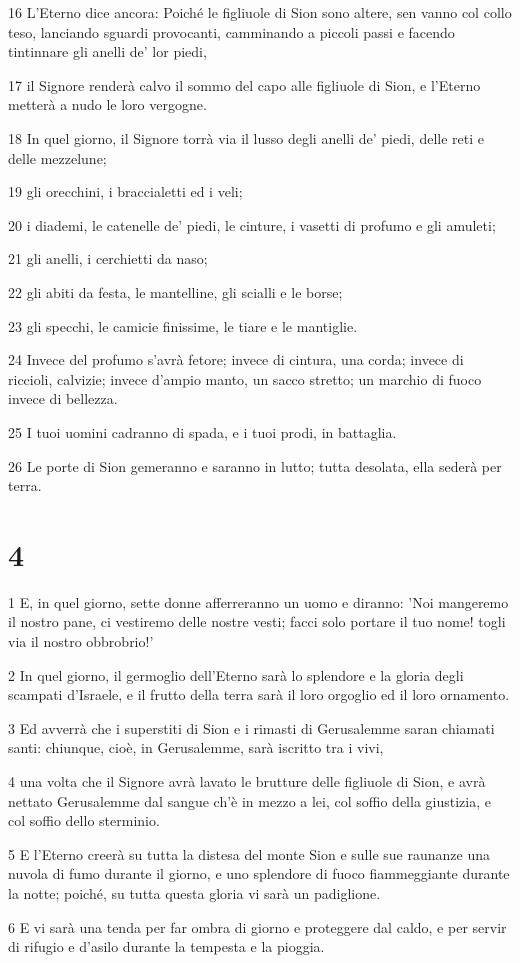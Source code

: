\par 16 L'Eterno dice ancora: Poiché le figliuole di Sion sono altere, sen vanno col collo teso, lanciando sguardi provocanti, camminando a piccoli passi e facendo tintinnare gli anelli de' lor piedi,
\par 17 il Signore renderà calvo il sommo del capo alle figliuole di Sion, e l'Eterno metterà a nudo le loro vergogne.
\par 18 In quel giorno, il Signore torrà via il lusso degli anelli de' piedi, delle reti e delle mezzelune;
\par 19 gli orecchini, i braccialetti ed i veli;
\par 20 i diademi, le catenelle de' piedi, le cinture, i vasetti di profumo e gli amuleti;
\par 21 gli anelli, i cerchietti da naso;
\par 22 gli abiti da festa, le mantelline, gli scialli e le borse;
\par 23 gli specchi, le camicie finissime, le tiare e le mantiglie.
\par 24 Invece del profumo s'avrà fetore; invece di cintura, una corda; invece di riccioli, calvizie; invece d'ampio manto, un sacco stretto; un marchio di fuoco invece di bellezza.
\par 25 I tuoi uomini cadranno di spada, e i tuoi prodi, in battaglia.
\par 26 Le porte di Sion gemeranno e saranno in lutto; tutta desolata, ella sederà per terra.

\chapter{4}

\par 1 E, in quel giorno, sette donne afferreranno un uomo e diranno: 'Noi mangeremo il nostro pane, ci vestiremo delle nostre vesti; facci solo portare il tuo nome! togli via il nostro obbrobrio!'
\par 2 In quel giorno, il germoglio dell'Eterno sarà lo splendore e la gloria degli scampati d'Israele, e il frutto della terra sarà il loro orgoglio ed il loro ornamento.
\par 3 Ed avverrà che i superstiti di Sion e i rimasti di Gerusalemme saran chiamati santi: chiunque, cioè, in Gerusalemme, sarà iscritto tra i vivi,
\par 4 una volta che il Signore avrà lavato le brutture delle figliuole di Sion, e avrà nettato Gerusalemme dal sangue ch'è in mezzo a lei, col soffio della giustizia, e col soffio dello sterminio.
\par 5 E l'Eterno creerà su tutta la distesa del monte Sion e sulle sue raunanze una nuvola di fumo durante il giorno, e uno splendore di fuoco fiammeggiante durante la notte; poiché, su tutta questa gloria vi sarà un padiglione.
\par 6 E vi sarà una tenda per far ombra di giorno e proteggere dal caldo, e per servir di rifugio e d'asilo durante la tempesta e la pioggia.

